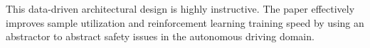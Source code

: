 This data-driven architectural design is highly instructive. The paper effectively improves sample utilization and reinforcement learning training speed by using an abstractor to abstract safety issues in the autonomous driving domain.

%

%